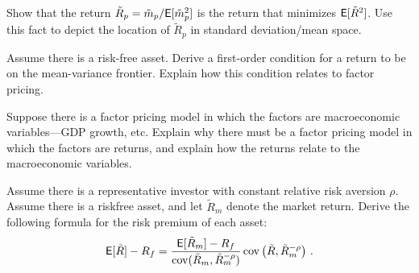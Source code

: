 


\item {} Show that the return $\tilde{R}_p = \tilde{m}_p/\mathsf{E}[\tilde{m}_p^2]$ is the return that minimizes $\mathsf{E}[\tilde{R}^2]$.  Use this fact to depict the location of $\tilde{R}_p$ in standard deviation/mean space.
\newpage


\item {} Assume there is a risk-free asset.  Derive a first-order condition for a return to be on the mean-variance frontier.  Explain how this condition relates to factor pricing.
\newpage


\item {} Suppose there is a factor pricing model in which the factors are macroeconomic variables---GDP growth, etc.  Explain why there must be a factor pricing model in which the factors are returns, and explain how the returns relate to the macroeconomic variables.

\newpage
\item {} Assume there is a representative investor with constant relative risk aversion $\rho$.  Assume there is a riskfree asset, and let $\tilde{R}_m$ denote the market return.  Derive the following formula for the risk premium of each asset:
$$\mathsf{E}[\tilde{R}] - R_f = \frac{\mathsf{E}[\tilde{R}_m]-R_f}{\operatorname{cov}(\tilde{R}_m,\tilde{R}_m^{-\rho})}\operatorname{cov}\left(\tilde{R},\tilde{R}_m^{-\rho}\right)\,.$$


